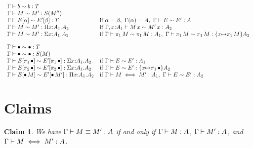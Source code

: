 \documentclass[]{article}
\begin{document}
\[\begin{array}{ll}
\weakconequiv{\context}{\basetype}{\basetype}{\ktype}\\
\weakconequiv{\context}{\constructor}{\constructor'}{\ksingleton{\constructor''}}\\
\weakconequiv{\context}{E[\alpha]}{E'[\beta]}{\ktype}&
  \mbox{if}\ \alpha = \beta,\ \context(\alpha) = \kind,\
  \weakconequiv{\context}{E}{E'}{\kind}\\
\weakconequiv{\context}{\constructor}{\constructor'}
  {\kpi{\cvar}{\kind_1}{\kind_2}}&
  \mbox{if}\ \weakconequiv{\context,\cvar{:}\kind_1}
  {\capply{\constructor}{\cvar}}{\capply{\constructor'}{\cvar}}
  {\kind_2}\\
\weakconequiv{\context}{\constructor}{\constructor'}
  {\ksigma{\cvar}{\kind_1}{\kind_2}}&
  \mbox{if}\ 
  \weakconequiv{\context}{\cpi{1}{\constructor}}{\cpi{1}{\constructor}}
   {\kind_1},\
  \weakconequiv{\context}{\cpi{1}{\constructor}}{\cpi{1}{\constructor}}
     {\substitute{\cvar}{\cpi{1}{\constructor}}{\kind_2}}\\[10pt]

\weakconequiv{\context}{\hole}{\hole}{\ktype}\\
\weakconequiv{\context}{\hole}{\hole}{\ksingleton{\constructor}}\\
\weakconequiv{\context}{E[\cpi{1}{\hole}]}{E'[\cpi{1}{\hole}]}
   {\ksigma{\cvar}{\kind_1}{\kind_2}}&
   \mbox{if}\ 
   \weakconequiv{\context}{E}{E'}{\kind_1}\\
\weakconequiv{\context}{E[\cpi{2}{\hole}]}{E'[\cpi{2}{\hole}]}
   {\ksigma{\cvar}{\kind_1}{\kind_2}}&
   \mbox{if}\ 
   \weakconequiv{\context}{E}{E'}{\substitute{\cvar}{\cpi{1}{\hole}}\kind_2}\\
\weakconequiv{\context}{E[\capply{\hole}{\constructor}]}
   {E'[\capply{\hole}{\constructor'}]}{\kpi{\cvar}{\kind_1}{\kind_2}}&
   \mbox{if}\
   \conequiv{\context}{\constructor}{\constructor'}{\kind_1},\
   \weakconequiv{\context}{E}{E'}{\kind_2}\\
\end{array}
\]

\section{Claims}

\newtheorem{claim}{Claim}

\begin{claim}
We have $\Gamma\vdash M \equiv M' : A$ if
and only if $\Gamma\vdash M : A$, 
$\Gamma\vdash M' : A$, and 
$\Gamma\vdash M \iff M' : A$.
\end{claim}
\end{document}
